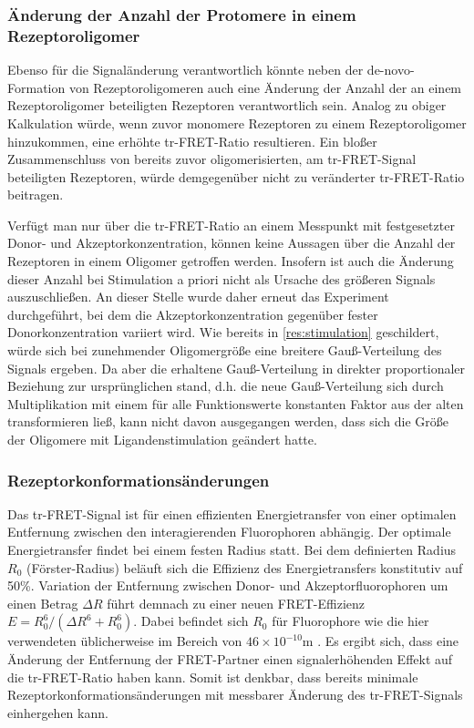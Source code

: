 \subsubsection{Änderung der Anzahl der Protomere in einem Rezeptoroligomer}
Ebenso für die Signaländerung verantwortlich könnte neben der de-novo-Formation von Rezeptoroligomeren auch eine Änderung der Anzahl der an einem Rezeptoroligomer beteiligten Rezeptoren verantwortlich sein. Analog zu obiger Kalkulation würde, wenn zuvor monomere Rezeptoren zu einem Rezeptoroligomer hinzukommen, eine erhöhte tr-FRET-Ratio resultieren. Ein bloßer Zusammenschluss von bereits zuvor oligomerisierten, am tr-FRET-Signal beteiligten Rezeptoren, würde demgegenüber nicht zu veränderter tr-FRET-Ratio beitragen.

Verfügt man nur über die tr-FRET-Ratio an einem Messpunkt mit festgesetzter Donor- und Akzeptorkonzentration, können keine Aussagen über die Anzahl der Rezeptoren in einem Oligomer getroffen werden. Insofern ist auch die Änderung dieser Anzahl bei Stimulation a priori nicht als Ursache des größeren Signals auszuschließen. An dieser Stelle wurde daher erneut das Experiment durchgeführt, bei dem die Akzeptorkonzentration gegenüber fester Donorkonzentration variiert wird. Wie bereits in \ref{res:stimulation} geschildert, würde sich bei zunehmender Oligomergröße eine breitere Gauß-Verteilung des Signals ergeben. Da aber die erhaltene Gauß-Verteilung in direkter proportionaler Beziehung zur ursprünglichen stand, d.h. die neue Gauß-Verteilung sich durch Multiplikation mit einem für alle Funktionswerte konstanten Faktor aus der alten transformieren ließ, kann nicht davon ausgegangen werden, dass sich die Größe der Oligomere mit Ligandenstimulation geändert hatte.

\subsubsection{Rezeptorkonformationsänderungen}
Das tr-FRET-Signal ist für einen effizienten Energietransfer von einer optimalen Entfernung zwischen den interagierenden Fluorophoren abhängig. Der optimale Energietransfer findet bei einem festen Radius statt. Bei dem definierten Radius $R_0$ (Förster-Radius) beläuft sich die Effizienz des Energietransfers konstitutiv auf 50\%. Variation der Entfernung zwischen Donor- und Akzeptorfluorophoren um einen Betrag $\Delta R$ führt demnach zu einer neuen FRET-Effizienz $E=R_0^6/(\Delta R^6+R_0^6)$. Dabei befindet sich $R_0$ für Fluorophore wie die hier verwendeten üblicherweise im Bereich von $46 \times 10^{-10}$\si{\meter} \parencite{Doumazane2011, Maurel2008}. Es ergibt sich, dass eine Änderung der Entfernung der FRET-Partner einen signalerhöhenden Effekt auf die tr-FRET-Ratio haben kann. Somit ist denkbar, dass bereits minimale Rezeptorkonformationsänderungen mit messbarer Änderung des tr-FRET-Signals einhergehen kann.

